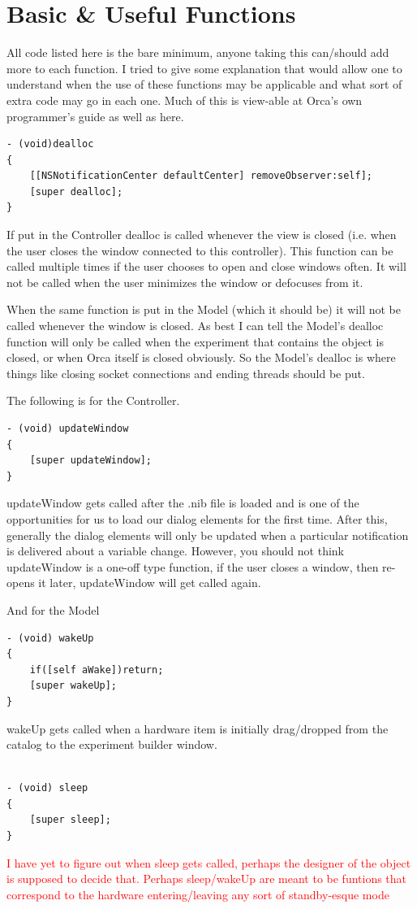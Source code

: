 \documentclass[12pt,a4paper]{article}
\begin{document}
\appendix
\section{Basic \& Useful Functions} \label{App:AppendixA}
All code listed here is the bare minimum, anyone taking this can/should add more to each function. 
I tried to give some explanation that would allow one to understand when the use of these functions may be applicable and what sort of extra code may go in each one. 
Much of this is view-able at Orca's own programmer's guide as well as here.
\\

\begin{lstlisting}
- (void)dealloc
{
    [[NSNotificationCenter defaultCenter] removeObserver:self];
    [super dealloc];
}
\end{lstlisting}
If put in the Controller dealloc is called whenever the view is closed (i.e. when the user closes the window connected to this controller).
This function can be called multiple times if the user chooses to open and close windows often. It will not be called when the user minimizes the window or defocuses from it.

When the same function is put in the Model (which it should be) it will not be called whenever the window is closed. As best I can tell the Model's dealloc function will only be called when the experiment that contains the object is closed, or when Orca itself is closed obviously. So the Model's dealloc is where things like closing socket connections and ending threads should be put.

The following is for the Controller.
\begin{lstlisting}
- (void) updateWindow
{
    [super updateWindow];
}
\end{lstlisting}
updateWindow gets called after the .nib file is loaded and is one of the opportunities for us to load our dialog elements for the first time. After this, generally the dialog elements will only
be updated when a particular notification is delivered about a variable change.
However, you should not think updateWindow is a one-off type function, if the user closes a window, 
then re-opens it later, updateWindow will get called again.




And for the Model

\begin{lstlisting}
- (void) wakeUp
{
    if([self aWake])return;
    [super wakeUp];
}
\end{lstlisting}
wakeUp gets called when a hardware item is initially drag/dropped from the catalog to the experiment builder window.
\begin{lstlisting}

- (void) sleep
{
    [super sleep];
}
\end{lstlisting}
\textcolor{red}{I have yet to figure out when sleep gets called, perhaps the designer of the object is supposed to decide that. 
Perhaps sleep/wakeUp are meant to be funtions that correspond to the hardware entering/leaving any sort of standby-esque mode }\\
\end{document}
